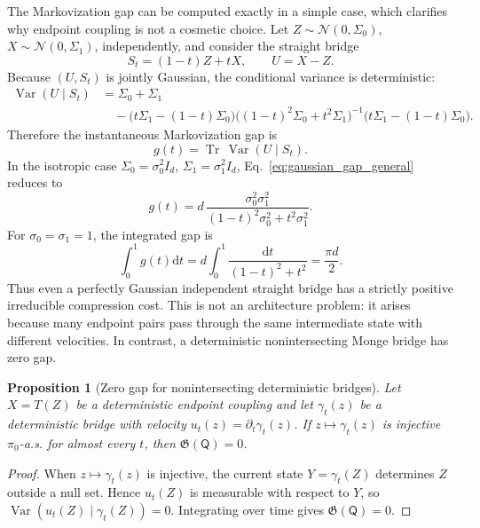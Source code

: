 \documentclass{article}
\newtheorem{proposition}{Proposition}
\numberwithin{equation}{section}
\newcommand{\dd}{\mathrm{d}}
\newcommand{\pbase}{\pi_0}
\newcommand{\scrQ}{\mathsf{Q}}
\newcommand{\Var}{\operatorname{Var}}
\newcommand{\Tr}{\operatorname{Tr}}
\begin{document}
The Markovization gap can be computed exactly in a simple case, which clarifies why endpoint coupling is not a cosmetic choice. Let
\(Z\sim\mathcal N(0,\Sigma_0)\), \(X\sim\mathcal N(0,\Sigma_1)\), independently, and consider the straight bridge
\begin{equation}
    S_t=(1-t)Z+tX,\qquad U=X-Z.
\end{equation}
Because \((U,S_t)\) is jointly Gaussian, the conditional variance is deterministic:
\begin{equation}
\begin{aligned}
\Var(U\mid S_t)
&=\Sigma_0+\Sigma_1 \\
&\quad -\bigl(t\Sigma_1-(1-t)\Sigma_0\bigr)
\bigl((1-t)^2\Sigma_0+t^2\Sigma_1\bigr)^{-1}
\bigl(t\Sigma_1-(1-t)\Sigma_0\bigr).
\end{aligned}
\label{eq:gaussian_gap_general}
\end{equation}
Therefore the instantaneous Markovization gap is
\begin{equation}
    g(t)=\Tr\,\Var(U\mid S_t).
\end{equation}
In the isotropic case \(\Sigma_0=\sigma_0^2I_d\), \(\Sigma_1=\sigma_1^2I_d\), Eq.~\eqref{eq:gaussian_gap_general} reduces to
\begin{equation}
    g(t)=d\,\frac{\sigma_0^2\sigma_1^2}{(1-t)^2\sigma_0^2+t^2\sigma_1^2}.
    \label{eq:isotropic_gap}
\end{equation}
For \(\sigma_0=\sigma_1=1\), the integrated gap is
\begin{equation}
    \int_0^1 g(t)\dd t=d\int_0^1\frac{\dd t}{(1-t)^2+t^2}=\frac{\pi d}{2}.
\end{equation}
Thus even a perfectly Gaussian independent straight bridge has a strictly positive irreducible compression cost. This is not an architecture problem: it arises because many endpoint pairs pass through the same intermediate state with different velocities. In contrast, a deterministic nonintersecting Monge bridge has zero gap.

\begin{proposition}[Zero gap for nonintersecting deterministic bridges]
\label{prop:zero_monge_gap}
Let \(X=T(Z)\) be a deterministic endpoint coupling and let \(\gamma_t(z)\) be a deterministic bridge with velocity \(u_t(z)=\partial_t\gamma_t(z)\). If \(z\mapsto\gamma_t(z)\) is injective \(\pbase\)-a.s. for almost every \(t\), then \(\mathfrak G(\scrQ)=0\).
\end{proposition}

\begin{proof}
When \(z\mapsto\gamma_t(z)\) is injective, the current state \(Y=\gamma_t(Z)\) determines \(Z\) outside a null set. Hence \(u_t(Z)\) is measurable with respect to \(Y\), so \(\Var(u_t(Z)\mid \gamma_t(Z))=0\). Integrating over time gives \(\mathfrak G(\scrQ)=0\).
\end{proof}
\end{document}
